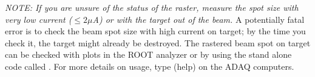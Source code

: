 {\it NOTE:  If you are unsure of the status of the raster,
measure the spot size with very low current ($\le 2 \mu$A) or with
the target out of the beam.}  A potentially fatal error 
is to check the beam spot size with high current on target; by
the time you check it, the target might already be destroyed.
The rastered beam spot on target can be checked with
plots in the ROOT analyzer or by 
using the stand alone code called .
For more details on usage, type  (help)
on the ADAQ computers.


%
%
%
%
%
%
%
